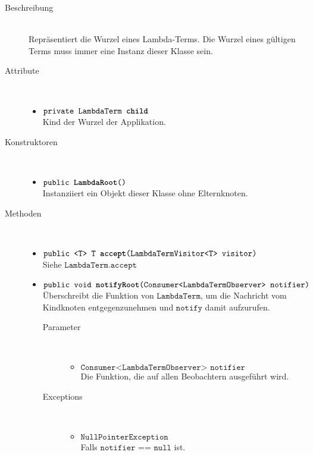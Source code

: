 \begin{description}
\item[Beschreibung] \hfill \\ Repräsentiert die Wurzel eines Lambda-Terms. Die Wurzel eines gültigen Terms muss immer eine Instanz dieser Klasse sein.

\item[Attribute] \hfill \\
	\vspace{-.8cm}
	\begin{itemize}
		\item $\texttt{private LambdaTerm \textbf{child}}$ \\ Kind der Wurzel der Applikation.
	\end{itemize}
	
\item[Konstruktoren] \hfill \\
	\vspace{-.8cm}
	\begin{itemize}
		\item $\texttt{public \textbf{LambdaRoot}()}$ \\ Instanziiert ein Objekt dieser Klasse ohne Elternknoten.
	\end{itemize}
	
\item[Methoden] \hfill \\
	\vspace{-.8cm}
	\begin{itemize}
		\item $\texttt{public <T> T \textbf{accept}(LambdaTermVisitor<T> visitor)}$ \\ Siehe $\texttt{LambdaTerm.accept}$
		
		\item $\texttt{public void \textbf{notifyRoot}(Consumer<LambdaTermObserver> notifier)}$ \\ Überschreibt die Funktion von $\texttt{LambdaTerm}$, um die Nachricht vom Kindknoten entgegenzunehmen und $\texttt{notify}$ damit aufzurufen.
		\begin{description}
			\item[Parameter] \hfill \\
			\vspace{-.8cm}
			\begin{itemize}
				\item $\texttt{Consumer<LambdaTermObserver> notifier}$ \\ Die Funktion, die auf allen Beobachtern ausgeführt wird.
			\end{itemize}
			\item[Exceptions] \hfill \\
			\vspace{-.8cm}
			\begin{itemize}
				\item $\texttt{NullPointerException}$ \\ Falls $\texttt{notifier == null}$ ist.
			\end{itemize}
		\end{description}
		

\end{itemize}
\end{description}
